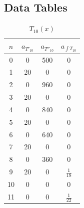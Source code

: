 \documentclass[11pt]{article} %
\begin{document}
{\subsection*{Data Tables}
{\renewcommand{\arraystretch}{1.1} %
\begin{table}[H]
\begin{minipage}{.5\linewidth}
\centering
\caption*{$T_{10}(x)$}
\begin{tabular}{| c | c | c | c |}
\hline 
$n$ & $a_{T'_{10}}$ & $a_{T''_{10}}$ & $a_{\int T_{10}}$ \\
\hline \hline
0 & 0 & 500 & 0\\
1 & 20 & 0 & 0\\
2 & 0& 960 & 0\\
3 & 20& 0& 0\\
4 & 0 & 840& 0\\
5 & 20 & 0 & 0\\
6 & 0 & 640 & 0\\
7 & 20 & 0 & 0\\
8 & 0 & 360 & 0\\
9 & 20 & 0 & $\frac{1}{18}$\\
10 & 0 & 0 & 0\\
11 &  0& 0& $\frac{1}{22}$\\
\hline
\end{tabular}
\end{minipage} 


\end{table}}}
\end{document}
